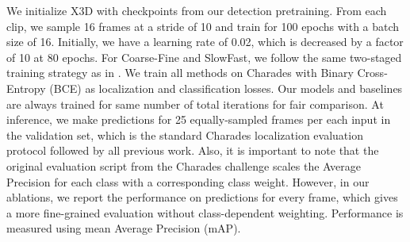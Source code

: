\documentclass[letterpaper]{article} \usepackage{aaai23}  \usepackage{times}  \usepackage{helvet}  \usepackage{courier}  \usepackage[hyphens]{url}  \usepackage{graphicx} \urlstyle{rm} \def\UrlFont{\rm}  \usepackage{natbib}  \usepackage{caption} \frenchspacing  \setlength{\pdfpagewidth}{8.5in}  \setlength{\pdfpageheight}{11in}  \usepackage{algorithm}
\newcommand{\ch}{}
\begin{document}
We initialize X3D \cite{feichtenhofer2020x3d} with checkpoints from our detection pretraining. From each clip, we sample 16 frames at a stride of 10 and train for 100 epochs with a batch size of 16. Initially, we have a learning rate of 0.02, which is decreased by a factor of 10 at 80 epochs. For Coarse-Fine and SlowFast, we follow the same two-staged training strategy as in \cite{kahatapitiya2021coarse}. 
We train all methods on Charades with Binary Cross-Entropy (BCE) as localization and classification losses. \ch{Our models and baselines are always trained for same number of total iterations for fair comparison.} At inference, we make predictions for 25 equally-sampled frames per each input in the validation set, which is the standard Charades localization evaluation protocol \cite{sigurdsson2016hollywood} followed by all previous work. Also, it is important to note that the original evaluation script from the Charades challenge scales the Average Precision for each class with a corresponding class weight. However, in our ablations, we report the performance on predictions for every frame, which gives a more fine-grained evaluation without class-dependent weighting. Performance is measured using mean Average Precision (mAP).
\end{document}
